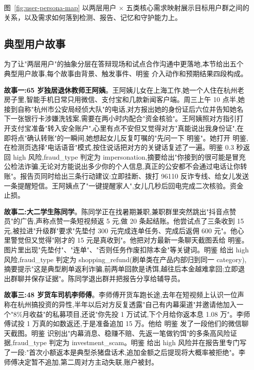 \documentclass[UTF8,a4paper,12pt]{ctexart}
\begin{document}
图~\ref{fig:user-persona-map} 以两层用户 × 五类核心需求映射展示目标用户群之间的关系，以及需求如何落到检测、报告、记忆和守护能力上。

\subsection{典型用户故事}

为了让"两层用户"的抽象分层在答辩现场和试点合作沟通中更落地,本节给出五个典型用户故事,每个故事由背景、触发事件、明鉴 介入动作和预期结果四段构成。

\textbf{故事一:65 岁独居退休教师王阿姨}。王阿姨儿女在上海工作,她一个人住在杭州老房子里,智能手机日常只用微信、支付宝和几款新闻客户端。周三上午 10 点半,她接到自称"杭州市公安局经侦大队"的电话,对方报出她的身份证后六位并告知她名下一张银行卡涉嫌洗钱案,需要在两小时内配合"资金核验"。王阿姨照对方指引打开支付宝准备"转入安全账户",心里有点不安但又觉得对方"真能说出我身份证",在即将点"确认转账"的一瞬间,她想起女儿反复叮嘱的"先问一下 明鉴"。她打开 明鉴,在检测页选择"电话语音"模式,按住说话把对方的关键话复述了一遍。明鉴 0.3 秒返回 high 风险,fraud\_type 判定为 impersonation,摘要给出"你接到的很可能是冒充公检法诈骗,无论对方能说出多少你的个人信息,真正的公安都不会通过电话让你转账"。报告页同时给出三条行动建议:立即挂断、拨打 96110 反诈专线、给女儿发送一条提醒短信。王阿姨点了"一键提醒家人",女儿几秒后回电完成二次核验。资金止损。

\textbf{故事二:大二学生陈同学}。陈同学正在找暑期兼职,兼职群里突然跳出"抖音点赞员"的广告,声称点赞一条短视频返 5 元,做 20 条起结账。他尝试点了三条收到 15 元,被拉进"升级群"要求"先垫付 300 元完成连单任务、完成后返佣 600 元"。他心里警觉但又觉得"刚才的 15 元是真收到"。他把对方最新一条聊天截图丢给 明鉴。图片里出现"先垫付"、"连单"、"否则任务作废扣除本金"等关键词。明鉴 给出 high 风险,fraud\_type 判定为 shopping\_refund(刷单类在产品内部归到同一 category),摘要提示"这是典型刷单返利诈骗,前两单回款是诱饵,越往后本金越难拿回;立即退出群聊并保存证据"。陈同学退出群并把报告分享给辅导员。

\textbf{故事三:48 岁货车司机李师傅}。李师傅开货车跑长途,去年在短视频上认识一位声称在杭州搞投资的异性,半年以后对方反复透露"自己有内幕渠道"并邀请他加入一个"8\%月收益"的私募项目,还说"你先投 1 万试试,下个月给你返本息 1.08 万"。李师傅试投 1 万真的如数返还,于是准备追加 15 万。他给 明鉴 发了一段他们的微信聊天截图。明鉴 识别出"内幕消息、稳赚不赔、先返一笔做钓饵"的多条高风险证据,fraud\_type 判定为 investment\_scam。明鉴 给出 high 风险并在报告里专门写了一段:"首次小额返本是典型杀猪盘话术,追加金额之后提现将大概率被拒绝"。李师傅决定暂不追加,第二周对方主动失联,账户被封。
\end{document}
